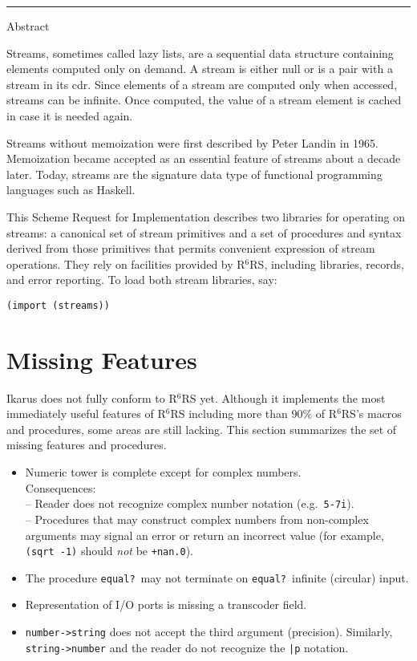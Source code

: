 \documentclass[onecolumn, 12pt, twoside, openright, dvipdfm]{book}
\newcommand{\rnrs}[1]{R$^{\mathrm{#1}}$RS}
\begin{document}
\begin{center}
\rule{\textwidth}{1pt}
Abstract
\end{center}

Streams, sometimes called lazy lists, are a sequential data
structure containing elements computed only on demand. A stream is
either null or is a pair with a stream in its cdr. Since elements of
a stream are computed only when accessed, streams can be infinite.
Once computed, the value of a stream element is cached in case it is
needed again.

Streams without memoization were first described by Peter Landin in
1965. Memoization became accepted as an essential feature of streams
about a decade later. Today, streams are the signature data type of
functional programming languages such as Haskell.

This Scheme Request for Implementation describes two libraries for
operating on streams: a canonical set of stream primitives and a set
of procedures and syntax derived from those primitives that permits
convenient expression of stream operations. They rely on facilities
provided by \rnrs{6}, including libraries, records, and error reporting.
To load both stream libraries, say:

\texttt{(import (streams))}

\chapter{Missing Features}

Ikarus does not fully conform to \rnrs{6} yet.  Although it
implements the most immediately useful features of \rnrs{6}
including more than 90\% of \rnrs{6}'s macros and procedures, some
areas are still lacking.  This section summarizes the set of
missing features and procedures.  


\begin{itemize}
\item Numeric tower is complete except for complex numbers.\\
  Consequences: \\
  -- Reader does not recognize complex number notation
    (e.g.~\texttt{5-7i}).\\
  -- Procedures that may construct complex numbers from non-complex
    arguments may signal an error or return an incorrect value
    (for example, \texttt{(sqrt -1)} should \emph{not} be \texttt{+nan.0}).
\item The procedure \texttt{equal?}\ may not terminate on
\texttt{equal?}\ infinite (circular) input.
\item Representation of I/O ports is missing a transcoder field.
\item \texttt{number->string} does not accept the third argument
(precision).  Similarly, \texttt{string->number} and the reader do
not recognize the \texttt{|p} notation. 
\end{itemize}
\newpage
\end{document}
